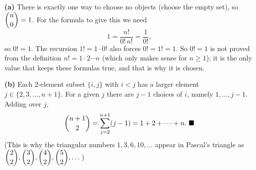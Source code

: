 \textbf{(a)} There is exactly one way to choose no objects (choose the empty set), so $\dbinom n0=1$. For the formula to give this we need
\[1=\dfrac{n!}{0!\,n!}=\dfrac1{0!},\]
so $0!=1$. The recursion $1!=1\cdot0!$ also forces $0!=1!=1$. So $0!=1$ is not proved from the definition $n!=1\cdot2\cdots n$ (which only makes sense for $n\ge1$); it is the only value that keeps these formulas true, and that is why it is chosen.

\textbf{(b)} Each $2$-element subset $\{i,j\}$ with $i<j$ has a larger element $j\in\{2,3,\dots,n+1\}$. For a given $j$ there are $j-1$ choices of $i$, namely $1,\dots,j-1$. Adding over $j$,
\[\dbinom{n+1}{2}=\sum_{j=2}^{n+1}(j-1)=1+2+\cdots+n.\ \blacksquare\]
(This is why the triangular numbers $1,3,6,10,\dots$ appear in Pascal's triangle as $\dbinom22,\dbinom32,\dbinom42,\dbinom52,\dots$)
